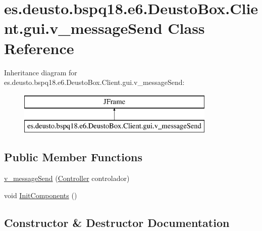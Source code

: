 \hypertarget{classes_1_1deusto_1_1bspq18_1_1e6_1_1_deusto_box_1_1_client_1_1gui_1_1v__message_send}{}\section{es.\+deusto.\+bspq18.\+e6.\+Deusto\+Box.\+Client.\+gui.\+v\+\_\+message\+Send Class Reference}
\label{classes_1_1deusto_1_1bspq18_1_1e6_1_1_deusto_box_1_1_client_1_1gui_1_1v__message_send}
Inheritance diagram for es.\+deusto.\+bspq18.\+e6.\+Deusto\+Box.\+Client.\+gui.\+v\+\_\+message\+Send\+:\begin{figure}[H]
\begin{center}
\leavevmode
\includegraphics[height=2.000000cm]{classes_1_1deusto_1_1bspq18_1_1e6_1_1_deusto_box_1_1_client_1_1gui_1_1v__message_send}
\end{center}
\end{figure}
\subsection*{Public Member Functions}
\begin{DoxyCompactItemize}
\item 
\mbox{\hyperlink{classes_1_1deusto_1_1bspq18_1_1e6_1_1_deusto_box_1_1_client_1_1gui_1_1v__message_send_a948abd357e3d27a4e4d0b6bd1732a69b}{v\+\_\+message\+Send}} (\mbox{\hyperlink{classes_1_1deusto_1_1bspq18_1_1e6_1_1_deusto_box_1_1_client_1_1controller_1_1_controller}{Controller}} controlador)
\item 
void \mbox{\hyperlink{classes_1_1deusto_1_1bspq18_1_1e6_1_1_deusto_box_1_1_client_1_1gui_1_1v__message_send_a0c148f60ff6097f89a881d50a500a66b}{Init\+Components}} ()
\end{DoxyCompactItemize}


\subsection{Constructor \& Destructor Documentation}
\mbox{\label{classes_1_1deusto_1_1bspq18_1_1e6_1_1_deusto_box_1_1_client_1_1gui_1_1v__message_send_a948abd357e3d27a4e4d0b6bd1732a69b}} 
